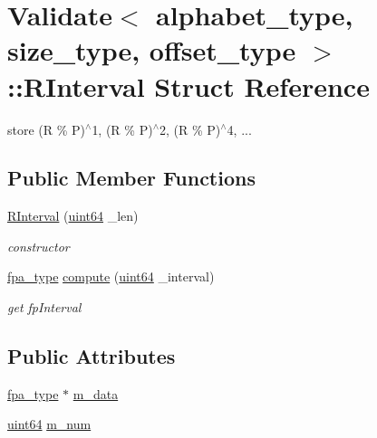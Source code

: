 \hypertarget{struct_validate_1_1_r_interval}{}\section{Validate$<$ alphabet\+\_\+type, size\+\_\+type, offset\+\_\+type $>$\+:\+:R\+Interval Struct Reference}
\label{struct_validate_1_1_r_interval}


store (R \% P)$^\wedge$1, (R \% P)$^\wedge$2, (R \% P)$^\wedge$4, ...  


\subsection*{Public Member Functions}
\begin{DoxyCompactItemize}
\item 
\hyperlink{struct_validate_1_1_r_interval_ad4edd1de89ff283674249f14ad7ec3de}{R\+Interval} (\hyperlink{types_8h_a60e8696a4678cd348e991a1f172e53f7}{uint64} \+\_\+len)
\begin{DoxyCompactList}\small\item\em constructor \end{DoxyCompactList}\item 
\hyperlink{common_8h_a7fdaf8b9b3d2f6ae6b10597a8d3f96ee}{fpa\+\_\+type} \hyperlink{struct_validate_1_1_r_interval_a15d2215c198eb022a01792b62cfad0ef}{compute} (\hyperlink{types_8h_a60e8696a4678cd348e991a1f172e53f7}{uint64} \+\_\+interval)
\begin{DoxyCompactList}\small\item\em get fp\+Interval \end{DoxyCompactList}\end{DoxyCompactItemize}
\subsection*{Public Attributes}
\begin{DoxyCompactItemize}
\item 
\hyperlink{common_8h_a7fdaf8b9b3d2f6ae6b10597a8d3f96ee}{fpa\+\_\+type} $\ast$ \hyperlink{struct_validate_1_1_r_interval_a163e4054b0e05de3538c1011a9f4c664}{m\+\_\+data}
\item 
\hyperlink{types_8h_a60e8696a4678cd348e991a1f172e53f7}{uint64} \hyperlink{struct_validate_1_1_r_interval_ab24650a97073141c105fdb3db61ca902}{m\+\_\+num}
\end{DoxyCompactItemize}


